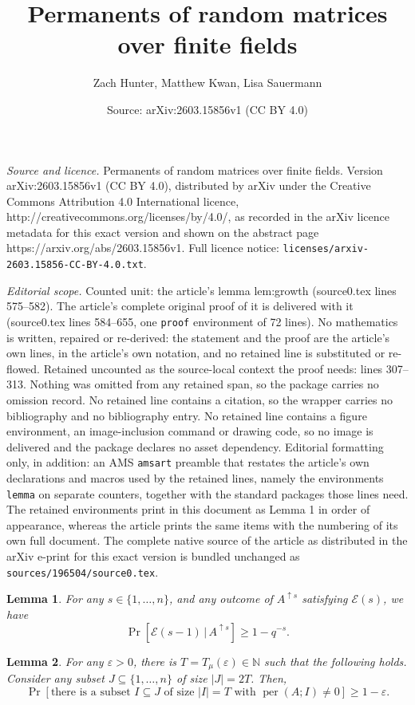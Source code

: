 \documentclass[10pt,a4paper]{amsart}
\title{Permanents of random matrices over finite fields}
\author{Zach Hunter, Matthew Kwan, Lisa Sauermann}
\date{Source: arXiv:2603.15856v1 (CC BY 4.0)}
\newtheorem{lemma}{Lemma}
\newcommand{\mb}{\mathbb}
\newcommand{\on}{\operatorname}
\begin{document}
\maketitle

\noindent\emph{Source and licence.} Permanents of random matrices over finite fields. Version arXiv:2603.15856v1 (CC BY 4.0), distributed by arXiv under the Creative Commons Attribution 4.0 International licence, http://creativecommons.org/licenses/by/4.0/, as recorded in the arXiv licence metadata for this exact version and shown on the abstract page https://arxiv.org/abs/2603.15856v1. Full licence notice: \texttt{licenses/arxiv-2603.15856-CC-BY-4.0.txt}.\par\smallskip

\noindent\textit{Editorial scope.} Counted unit: the article's lemma lem:growth (source0.tex lines 575--582). The article's complete original proof of it is delivered with it (source0.tex lines 584--655, one \texttt{proof} environment of 72 lines). No mathematics is written, repaired or re-derived: the statement and the proof are the article's own lines, in the article's own notation, and no retained line is substituted or re-flowed.  Retained uncounted as the source-local context the proof needs: lines 307--313.  Nothing was omitted from any retained span, so the package carries no omission record.  No retained line contains a citation, so the wrapper carries no bibliography and no bibliography entry.  No retained line contains a figure environment, an image-inclusion command or drawing code, so no image is delivered and the package declares no asset dependency.  Editorial formatting only, in addition: an AMS \texttt{amsart} preamble that restates the article's own declarations and macros used by the retained lines, namely the environments \texttt{lemma} on separate counters, together with the standard packages those lines need.  The retained environments print in this document as Lemma 1 in order of appearance, whereas the article prints the same items with the numbering of its own full document.  The complete native source of the article as distributed in the arXiv e-print for this exact version is bundled unchanged as \texttt{sources/196504/source0.tex}.
\begin{lemma}
\label{lem:match-det-0}For any $s\in\{1,\dots,n\}$, and any outcome
of $A^{\uparrow s}$ satisfying $\mathcal{E}(s)$, we have
\[
\Pr[\mathcal{E}(s-1)\,|\,A^{\uparrow s}]\ge1-q^{-s}.
\]
\end{lemma}

\begin{lemma}\label{lem:growth}
For any $\varepsilon>0$, there is $T=T_\mu(\varepsilon)\in\mb N$ such that the following
holds. Consider any subset $J\subseteq\{1,\dots,n\}$ of size $|J|=2T$.
Then,
\[
\Pr[\text{there is a}\text{ subset }I\subseteq J\text{ of size }|I|=T\text{ with }\on{per}(A;I)\ne0]\ge 1-\varepsilon.
\]
\end{lemma}
\end{document}
